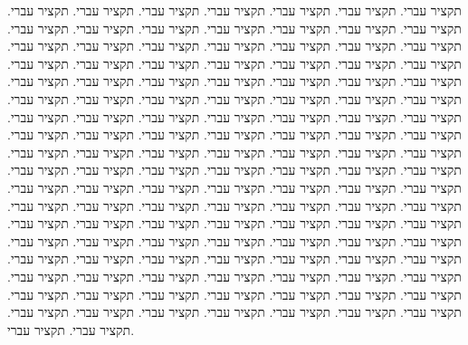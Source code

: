 תקציר עברי.  תקציר עברי.  תקציר עברי.  תקציר עברי.  תקציר עברי.  תקציר עברי.  תקציר עברי.  תקציר עברי.  תקציר עברי.  תקציר עברי.  תקציר עברי.  תקציר
עברי.  תקציר עברי.  תקציר עברי.  תקציר עברי.  תקציר עברי.  תקציר עברי.  תקציר עברי.  תקציר עברי.  תקציר עברי.  תקציר עברי.  תקציר עברי.  תקציר עברי.
תקציר עברי.  תקציר עברי.  תקציר עברי.  תקציר עברי.  תקציר עברי.  תקציר עברי.  תקציר עברי.  תקציר עברי.  תקציר עברי.  תקציר עברי.  תקציר עברי.  תקציר
עברי.  תקציר עברי.  תקציר עברי.  תקציר עברי.  תקציר עברי.  תקציר עברי.  תקציר עברי.  תקציר עברי.  תקציר עברי.  תקציר עברי.  תקציר עברי.  תקציר עברי.
תקציר עברי.  תקציר עברי.  תקציר עברי.  תקציר עברי.  תקציר עברי.  תקציר עברי.  תקציר עברי.  תקציר עברי.  תקציר עברי.  תקציר עברי.  תקציר עברי.  תקציר
עברי.  תקציר עברי.  תקציר עברי.  תקציר עברי.  תקציר עברי.  תקציר עברי.  תקציר עברי.  תקציר עברי.  תקציר עברי.  תקציר עברי.  תקציר עברי.  תקציר עברי.
תקציר עברי.  תקציר עברי.  תקציר עברי.  תקציר עברי.  תקציר עברי.  תקציר עברי.  תקציר עברי.  תקציר עברי.  תקציר עברי.  תקציר עברי.  תקציר עברי.  תקציר
עברי.  תקציר עברי.  תקציר עברי.  תקציר עברי.  תקציר עברי.  תקציר עברי.  תקציר עברי.  תקציר עברי.  תקציר עברי.  תקציר עברי.  תקציר עברי.  תקציר עברי.
תקציר עברי.  תקציר עברי.  תקציר עברי.  תקציר עברי.  תקציר עברי.  תקציר עברי.  תקציר עברי.  תקציר עברי.  תקציר עברי.  תקציר עברי.  תקציר עברי.  תקציר
עברי.  תקציר עברי.  תקציר עברי.  תקציר עברי.  תקציר עברי.  תקציר עברי.  תקציר עברי.  תקציר עברי.  תקציר עברי.  תקציר עברי.  תקציר עברי.  תקציר עברי.
תקציר עברי.  תקציר עברי.  תקציר עברי.  תקציר עברי.  תקציר עברי.  תקציר עברי.  תקציר עברי.  תקציר עברי.  תקציר עברי.  תקציר עברי.  תקציר עברי.  תקציר
עברי.  תקציר עברי.

